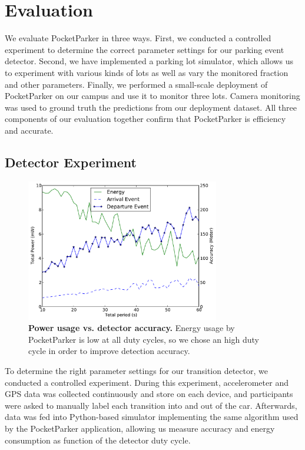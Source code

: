 \section{Evaluation}
\label{sec-evaluation}

We evaluate PocketParker in three ways. First, we conducted a controlled
experiment to determine the correct parameter settings for our parking event
detector. Second, we have implemented a parking lot simulator, which allows
us to experiment with various kinds of lots as well as vary the monitored
fraction and other parameters. Finally, we performed a small-scale deployment
of PocketParker on our campus and use it to monitor three lots. Camera
monitoring was used to ground truth the predictions from our deployment
dataset. All three components of our evaluation together confirm that
PocketParker is efficiency and accurate.

\subsection{Detector Experiment}

\begin{figure}
\centering
\includegraphics[width=3.325in]{./figures/Energy_accuracy.pdf}

\caption{\textbf{Power usage vs. detector accuracy.} Energy usage by
PocketParker is low at all duty cycles, so we chose an high duty cycle in
order to improve detection accuracy.}

\label{fig-energy}
\end{figure}



To determine the right parameter settings for our transition detector, we
conducted a controlled experiment. During this experiment, accelerometer and
GPS data was collected continuously and store on each device, and
participants were asked to manually label each transition into and out of the
car. Afterwards, data was fed into Python-based simulator implementing the
same algorithm used by the PocketParker application, allowing us measure
accuracy and energy consumption as function of the detector duty cycle.

